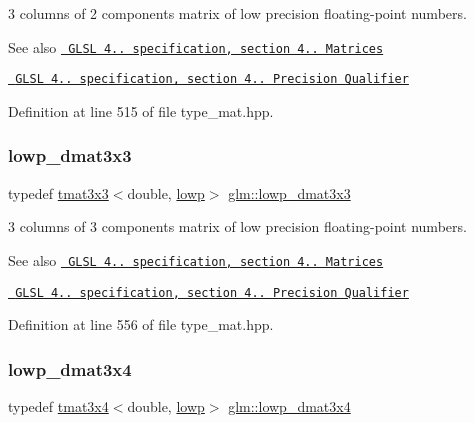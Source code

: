 3 columns of 2 components matrix of low precision floating-\/point numbers.

\begin{DoxySeeAlso}{See also}
\href{http://www.opengl.org/registry/doc/GLSLangSpec.4.20.8.pdf}{\texttt{ G\+L\+SL 4.. specification, section 4.. Matrices}} 

\href{http://www.opengl.org/registry/doc/GLSLangSpec.4.20.8.pdf}{\texttt{ G\+L\+SL 4.. specification, section 4.. Precision Qualifier}} 
\end{DoxySeeAlso}


Definition at line 515 of file type\+\_\+mat.\+hpp.

\mbox{\label{group__core__precision_ga8cc302ca16a2ae1708143c85d50de0e7}} 
\subsubsection{\texorpdfstring{lowp\_dmat3x3}{lowp\_dmat3x3}}
{\footnotesize\ttfamily typedef \mbox{\hyperlink{structglm_1_1tmat3x3}{tmat3x3}}$<$double, \mbox{\hyperlink{namespaceglm_a0f04f086094c747d227af4425893f545ae161af3fc695e696ce3bf69f7332bc2d}{lowp}}$>$ \mbox{\hyperlink{group__core__precision_ga8cc302ca16a2ae1708143c85d50de0e7}{glm\+::lowp\+\_\+dmat3x3}}}

3 columns of 3 components matrix of low precision floating-\/point numbers.

\begin{DoxySeeAlso}{See also}
\href{http://www.opengl.org/registry/doc/GLSLangSpec.4.20.8.pdf}{\texttt{ G\+L\+SL 4.. specification, section 4.. Matrices}} 

\href{http://www.opengl.org/registry/doc/GLSLangSpec.4.20.8.pdf}{\texttt{ G\+L\+SL 4.. specification, section 4.. Precision Qualifier}} 
\end{DoxySeeAlso}


Definition at line 556 of file type\+\_\+mat.\+hpp.

\mbox{\label{group__core__precision_gadbca772b626928af301ea079903ee5d9}} 
\subsubsection{\texorpdfstring{lowp\_dmat3x4}{lowp\_dmat3x4}}
{\footnotesize\ttfamily typedef \mbox{\hyperlink{structglm_1_1tmat3x4}{tmat3x4}}$<$double, \mbox{\hyperlink{namespaceglm_a0f04f086094c747d227af4425893f545ae161af3fc695e696ce3bf69f7332bc2d}{lowp}}$>$ \mbox{\hyperlink{group__core__precision_gadbca772b626928af301ea079903ee5d9}{glm\+::lowp\+\_\+dmat3x4}}}

